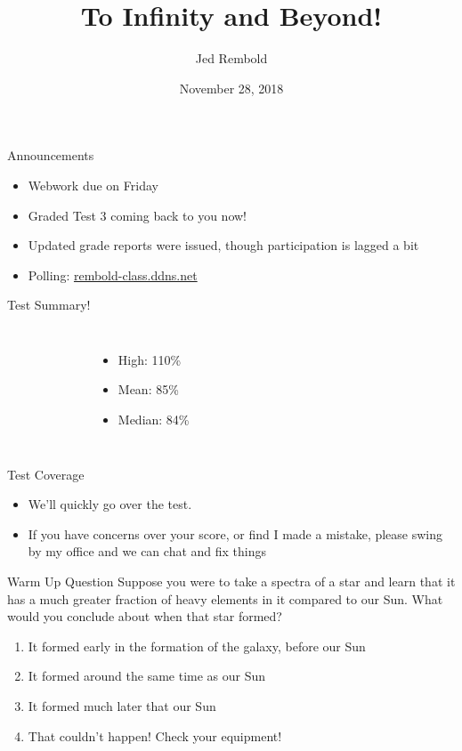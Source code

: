 \documentclass[pdf,aspectratio=169]{beamer}
\title{To Infinity and Beyond!}
\date{November 28, 2018}
\author{Jed Rembold}
\begin{document}
\renewcommand*{\theenumi}{\Alph{enumi}}

\begin{frame}{Announcements}
  \begin{itemize}
	\item Webwork due on Friday
	\item Graded Test 3 coming back to you now!
	\item Updated grade reports were issued, though participation is lagged a bit
	\item Polling: \url{rembold-class.ddns.net}
  \end{itemize}
\end{frame}

\begin{frame}{Test Summary!}
  \begin{columns}
	  \begin{figure}[h!]
		\centering
	  \end{figure}
	  \begin{itemize}
		\item High: 110\%
		\item Mean: 85\%
		\item Median: 84\%
	  \end{itemize}
	\end{columns}
\end{frame}

\begin{frame}{Test Coverage}
  \begin{itemize}
	\item We'll quickly go over the test.
	\item If you have concerns over your score, or find I made a mistake, please swing by my office and we can chat and fix things
  \end{itemize}
\end{frame}

\begin{frame}{Warm Up Question}
	Suppose you were to take a spectra of a star and learn that it has a much greater fraction of heavy elements in it compared to our Sun. What would you conclude about when that star formed?
	\begin{enumerate}
		\item It formed early in the formation of the galaxy, before our Sun
		\item It formed around the same time as our Sun
		\item \alert<2>{It formed much later that our Sun}
		\item That couldn't happen! Check your equipment!
	\end{enumerate}
\end{frame}
\end{document}
